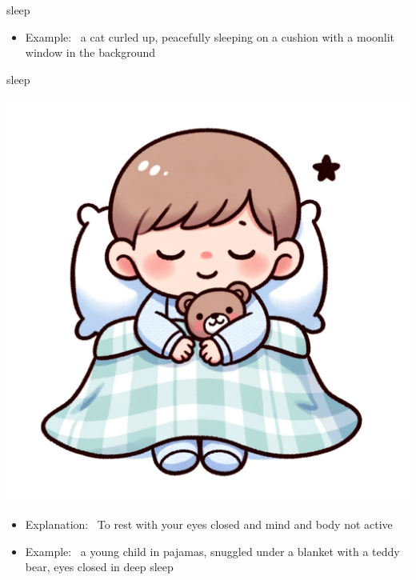 \documentclass[avery5371, grid,frame]{flashcards}
\begin{document}
\begin{flashcard}{sleep}
\begin{center}
\begin{minipage}[c]{.45\textwidth}
\begin{itemize}
            \item Example: \ a cat curled up, peacefully sleeping on a cushion with a moonlit window in the background
            \end{itemize}
        \end{minipage}
    \end{center}
    \vspace*{\fill}
\end{flashcard}\begin{flashcard}{sleep}
    \vspace*{\fill}
    \begin{center}
        \begin{minipage}[c]{.45\textwidth}
            \includegraphics[width=\textwidth]{cards/s/sleep/sleep - a young child in pajamas, snuggled under a blanket with a teddy bear, eyes closed in deep sleep.png}
        \end{minipage}
        \begin{minipage}[c]{.45\textwidth}
            \begin{itemize}\setlength\itemsep{12pt}
            \item Explanation: \ To rest with your eyes closed and mind and body not active

            \item Example: \ a young child in pajamas, snuggled under a blanket with a teddy bear, eyes closed in deep sleep
            \end{itemize}
        \end{minipage}
    \end{center}
    \vspace*{\fill}
\end{flashcard}
\end{document}
